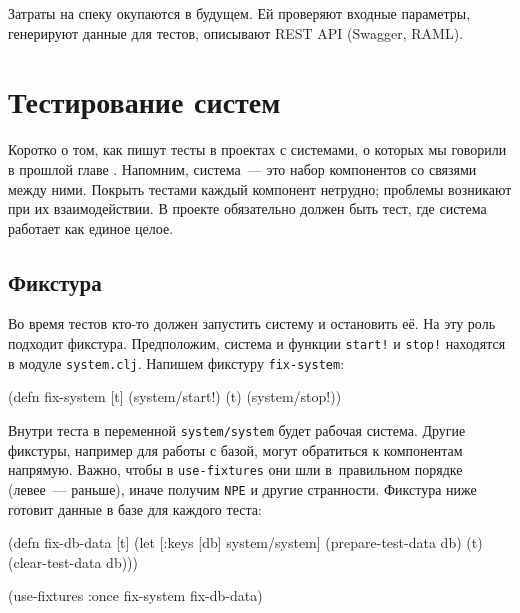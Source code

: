 
Затраты на спеку окупаются в будущем. Ей проверяют входные параметры, генерируют
данные для тестов, описывают REST API (Swagger, RAML).

\section{Тестирование систем}


Коротко о том, как пишут тесты в проектах с системами, о которых мы говорили в
прошлой главе . Напомним, система~--- это набор компонентов со
связями между ними. Покрыть тестами каждый компонент нетрудно; проблемы
возникают при их взаимодействии. В проекте обязательно должен быть тест, где
система работает как единое целое.

\subsection{Фикстура}


Во время тестов кто-то должен запустить систему и остановить её. На эту роль
подходит фикстура. Предположим, система и функции \verb|start!| и \verb|stop!|
находятся в модуле \verb|system.clj|. Напишем фикстуру \verb|fix-system|:

\begin{english}
  \begin{clojure}
(defn fix-system
  [t]
  (system/start!)
  (t)
  (system/stop!))
  \end{clojure}
\end{english}

Внутри теста в переменной \verb|system/system| будет рабочая система. Другие
фикстуры, например для работы с базой, могут обратиться к компонентам
напрямую. Важно, чтобы в \verb|use-fixtures| они шли в~правильном порядке
(левее~--- раньше), иначе получим \verb|NPE| и другие странности. Фикстура ниже
готовит данные в базе для каждого теста:


\ifx\devicetype\mobile

\begin{english}
  \begin{clojure}
(defn fix-db-data
  [t]
  (let [{:keys [db]} system/system]
    (prepare-test-data db)
    (t)
    (clear-test-data db)))

(use-fixtures :once
  fix-system fix-db-data)
  \end{clojure}
\end{english}

